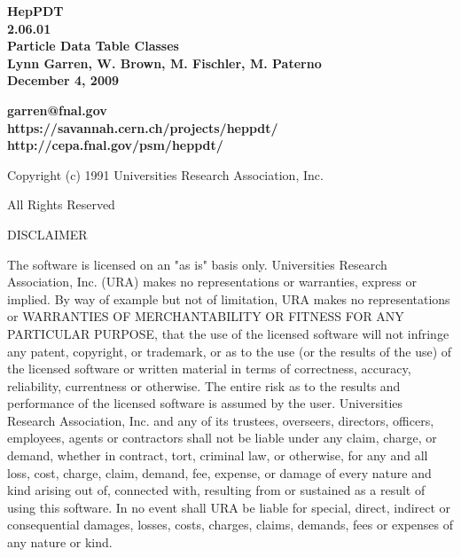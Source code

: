 \begin{titlepage}

{}

\vspace{2.0in}
\begin{center}
  {\LARGE\bf  HepPDT \\ 2.06.01 \\}
  {\Large\bf  Particle Data Table Classes \\}
  {\Large\bf  Lynn Garren, W. Brown, M. Fischler, M. Paterno \\}
  {\Large\bf  December 4, 2009 \\}
\end{center}
\vspace{2.0in}
\begin{center}
  {\large\bf  garren@fnal.gov \\}
  {\large\bf  https://savannah.cern.ch/projects/heppdt/ \\}
  {\large\bf  http://cepa.fnal.gov/psm/heppdt/ \\}
\end{center}

\end{titlepage}

\vspace{0.5in}
\centerline{ Copyright (c) 1991   Universities Research Association, Inc. }
\centerline{   All Rights Reserved }
\vspace{0.2in}
\centerline{ DISCLAIMER }

The software is licensed on an "as is" basis only.  Universities Research
Association, Inc. (URA) makes no representations or warranties, express
or implied.  By way of example but not of limitation, URA makes no
representations or WARRANTIES OF MERCHANTABILITY OR FITNESS FOR ANY
PARTICULAR PURPOSE, that  the use of the licensed software will not
infringe any patent, copyright, or trademark, or as to the use (or the
results of the use) of the licensed  software or written material in
terms of correctness, accuracy, reliability, currentness or otherwise.
The entire risk as to the results and performance of the  licensed
software is assumed by the user.  Universities Research Association, Inc.
and any of its trustees, overseers, directors, officers, employees,
agents or contractors shall not be liable under any claim, charge, or
demand, whether in contract, tort, criminal law, or otherwise, for any
and all loss, cost, charge, claim, demand, fee, expense, or damage of
every nature and kind arising out of, connected with, resulting from or
sustained as a result of using this software. In no event shall URA be
liable for special, direct, indirect or consequential damages, losses,
costs, charges, claims, demands, fees or expenses of any  nature or kind.
 
